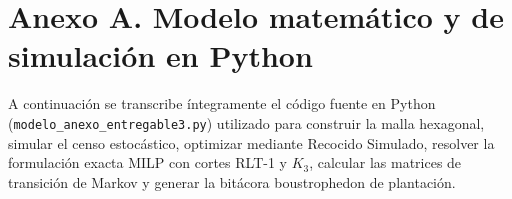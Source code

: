 \documentclass[11pt,a4paper]{article}
\begin{document}
\newpage

\section*{Anexo A. Modelo matemático y de simulación en Python}\label{sec:anexo_python}

A continuación se transcribe íntegramente el código fuente en Python (\texttt{modelo\_anexo\_entregable3.py}) utilizado para construir la malla hexagonal, simular el censo estocástico, optimizar mediante Recocido Simulado, resolver la formulación exacta MILP con cortes RLT-1 y $K_3$, calcular las matrices de transición de Markov y generar la bitácora boustrophedon de plantación.

\vspace{0.4cm}

\end{document}
